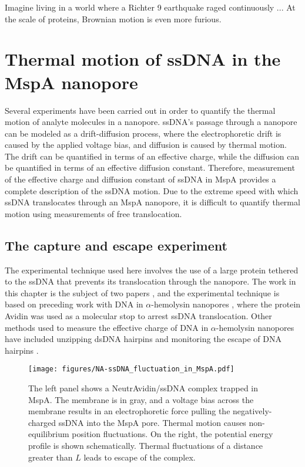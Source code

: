 \begin{savequote}[75mm]
Imagine living in a world where a Richter 9 earthquake raged continuously ... At the scale of proteins, Brownian motion is even more furious.
\end{savequote}

\chapter{Thermal motion of ssDNA in the MspA nanopore}
\label{dna_thermal_motion_mspa}

Several experiments have been carried out in order to quantify the thermal motion of analyte molecules in a nanopore.  ssDNA's passage through a nanopore can be modeled as a drift-diffusion process, where the electrophoretic drift is caused by the applied voltage bias, and diffusion is caused by thermal motion.  The drift can be quantified in terms of an effective charge, while the diffusion can be quantified in terms of an effective diffusion constant.  Therefore, measurement of the effective charge and diffusion constant of ssDNA in MspA provides a complete description of the ssDNA motion.  Due to the extreme speed with which ssDNA translocates through an MspA nanopore, it is difficult to quantify thermal motion using measurements of free translocation.

\section{The capture and escape experiment}

The experimental technique used here involves the use of a large protein tethered to the ssDNA that prevents its translocation through the nanopore.  The work in this chapter is the subject of two papers \citep{Lu2015,Fleming2017}, and the experimental technique is based on preceding work with DNA in $\alpha$-hemolysin nanopores \citep{Wiggin2008}, where the protein Avidin was used as a molecular stop to arrest ssDNA translocation.  Other methods used to measure the effective charge of DNA in $\alpha$-hemolysin nanopores have included unzipping dsDNA hairpins \citep{Sauer-Budge2003,Mathe2004,Lakatos2005} and monitoring the escape of DNA hairpins \citep{Wanunu2008,Lathrop2010}.

\begin{figure}[h]
\begin{centering}
\texttt{[image: figures/NA-ssDNA\_fluctuation\_in\_MspA.pdf]}
\caption[The idea of capture and escape]{The left panel shows a NeutrAvidin/ssDNA complex trapped in MspA.  The membrane is in gray, and a voltage bias across the membrane results in an electrophoretic force pulling the negatively-charged ssDNA into the MspA pore.  Thermal motion causes non-equilibrium position fluctuations.  On the right, the potential energy profile is shown schematically.  Thermal fluctuations of a distance greater than $L$ leads to escape of the complex.}
\label{fig:capture_escape_idea}
\end{centering}
\end{figure}

